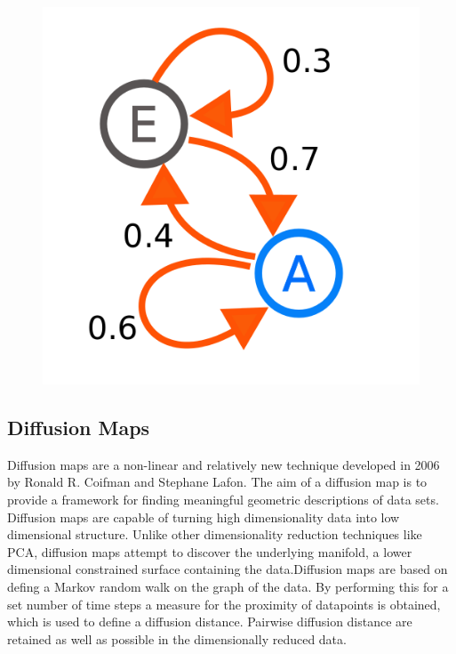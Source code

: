 \begin{figure}[h]
    \centering
    \includegraphics[height=0.25\textheight]{fig03/markov}
    \label{fig:kinect}
\end{figure}




\subsection{Diffusion Maps}
Diffusion maps are a non-linear and relatively new technique developed in 2006 by Ronald R. Coifman and Stephane Lafon.\cite{Coifman2006} The aim of a diffusion map is to provide a framework for finding meaningful geometric descriptions of data sets. Diffusion maps are capable of turning high dimensionality data into low dimensional structure. Unlike other dimensionality reduction techniques like PCA, diffusion maps attempt to discover the underlying manifold, a lower dimensional constrained surface containing the data.Diffusion maps are based on defing a Markov random walk on the graph of the data. By performing this for a set number of time steps a measure for the proximity of datapoints is obtained, which is used to define a diffusion distance. Pairwise diffusion distance are retained as well as possible in the dimensionally reduced data.


